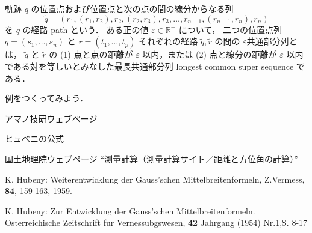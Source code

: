 \documentclass[11pt]{jarticle}
\begin{document}
\begin{defn}[2つの位置点列の最長共通部分列 (II)]
軌跡 $q$ の位置点および位置点と次の点の間の線分からなる列
\[
\tilde{q} = (r_1, (r_1, r_2), r_2, (r_2, r_3), r_3, \ldots, r_{n-1}, (r_{n-1}, r_n), r_n)
\]
を $q$ の経路 path という．
ある正の値 $\varepsilon \in \mathbb{R}^+$ について，
二つの位置点列 $q = (s_1, \ldots, s_n)$ と $r = (t_1, \ldots, t_p)$ それぞれの経路 $\tilde{q}, \tilde{r}$ の間の $\varepsilon$共通部分列とは，
 $\tilde{q}$ と $\tilde{r}$ の (1) 点と点の距離が $\varepsilon$ 以内，または (2) 点と線分の距離が $\varepsilon$ 以内である対を等しいとみなした最長共通部分列 longest common super sequence である．
\end{defn}

\begin{example}
例をつくってみよう．
\end{example}

\begin{thebibliography}{4}

アマノ技研ウェブページ

ヒュベニの公式

国土地理院ウェブページ ``測量計算（測量計算サイト／距離と方位角の計算）''

K. Hubeny: 
\newblock Weiterentwicklung der Gauss'schen Mittelbreitenformeln, Z.Vermess, {\bf 84}, 159-163, 1959.

K. Hubeny: 
\newblock
Zur Entwicklung der Gauss'schen Mittelbreitenformeln. Osterreichische Zeitschrift fur Vernessubgswesen, {\bf 42} Jahrgang (1954) Nr.1,S. 8-17

\end{thebibliography}
\end{document}
